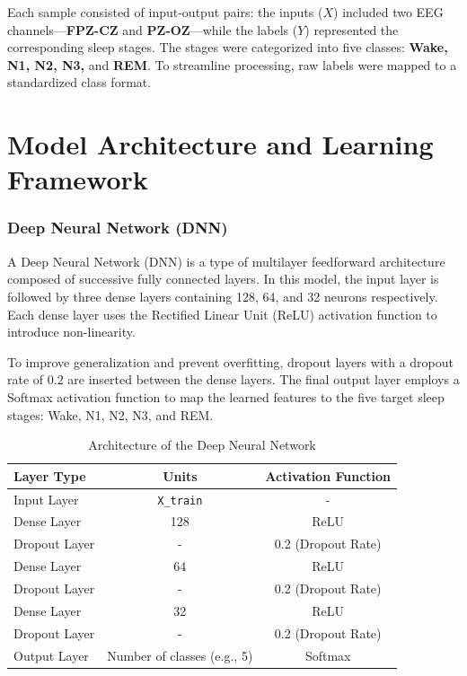 Each sample consisted of input-output pairs: the inputs ($X$) included two EEG channels—\textbf{FPZ-CZ} and \textbf{PZ-OZ}—while the labels ($Y$) represented the corresponding sleep stages. The stages were categorized into five classes: \textbf{Wake, N1, N2, N3,} and \textbf{REM}. To streamline processing, raw labels were mapped to a standardized class format.

\section{Model Architecture and Learning Framework}


\subsubsection{Deep Neural Network (DNN)}

A Deep Neural Network (DNN) is a type of multilayer feedforward architecture composed of successive fully connected layers. In this model, the input layer is followed by three dense layers containing 128, 64, and 32 neurons respectively. Each dense layer uses the Rectified Linear Unit (ReLU) activation function to introduce non-linearity.

To improve generalization and prevent overfitting, dropout layers with a dropout rate of 0.2 are inserted between the dense layers. The final output layer employs a Softmax activation function to map the learned features to the five target sleep stages: Wake, N1, N2, N3, and REM.

\begin{table}[H]
	\centering
	\caption{Architecture of the Deep Neural Network}
	\label{tab:nn_architecture}
	\begin{tabular}{lcc}
		\hline
		\textbf{Layer Type} & \textbf{Units} & \textbf{Activation Function} \\
		\hline
		Input Layer         & \texttt{X\_train}          & - \\
		Dense Layer         & 128                        & ReLU \\
		Dropout Layer       & -                          & 0.2 (Dropout Rate) \\
		Dense Layer         & 64                         & ReLU \\
		Dropout Layer       & -                          & 0.2 (Dropout Rate) \\
		Dense Layer         & 32                         & ReLU \\
		Dropout Layer       & -                          & 0.2 (Dropout Rate) \\
		Output Layer        & Number of classes (e.g., 5) & Softmax \\
		\hline
	\end{tabular}
\end{table}


